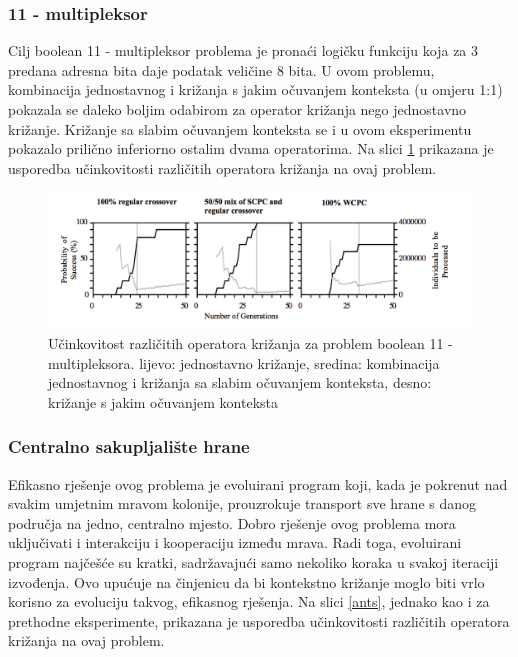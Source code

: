 \subsubsection{11 - multipleksor}
Cilj boolean 11 - multipleksor problema je pronaći logičku funkciju koja za 3 predana adresna bita daje podatak veličine 8 bita. U ovom problemu, kombinacija jednostavnog i križanja s jakim očuvanjem konteksta (u omjeru 1:1) pokazala se daleko boljim odabirom za operator križanja nego jednostavno križanje. Križanje sa slabim očuvanjem konteksta se i u ovom eksperimentu pokazalo prilično inferiorno ostalim dvama operatorima. Na slici \ref{mux} prikazana je usporedba učinkovitosti različitih operatora križanja na ovaj problem.

\begin{figure}[H]
	\centering
	\includegraphics[scale=0.4]{./slike/mux.png}
	\caption{Učinkovitost različitih operatora križanja za problem boolean 11 - multipleksora. lijevo: jednostavno križanje, sredina: kombinacija jednostavnog i križanja sa slabim očuvanjem konteksta, desno:  križanje s jakim očuvanjem konteksta}
	\label{mux}
\end{figure}



\subsubsection{Centralno sakupljalište hrane}
Efikasno rješenje ovog problema je evoluirani program koji, kada je pokrenut nad svakim umjetnim mravom kolonije, prouzrokuje transport sve hrane s danog područja na jedno, centralno mjesto. Dobro rješenje ovog problema mora uključivati i interakciju i kooperaciju između mrava. Radi toga, evoluirani program najčešće su kratki, sadržavajući samo nekoliko koraka u svakoj iteraciji izvođenja. Ovo upućuje na činjenicu da bi kontekstno križanje moglo biti vrlo korisno za evoluciju takvog, efikasnog rješenja. Na slici \ref{ants}, jednako kao i za prethodne eksperimente, prikazana je usporedba učinkovitosti različitih operatora križanja na ovaj problem.

